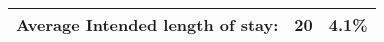 \begin{tabular}[t]{|p{4.7cm}|p{1.25cm}|p{1.3cm}|}
  \hline
  \hline
Average Intended length of stay: & 20 & 4.1\% \\ 
   \hline
\end{tabular}
